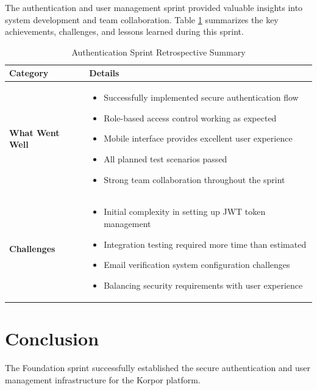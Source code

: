 The authentication and user management sprint provided valuable insights into system development and team collaboration. Table \ref{tab:auth-retrospective} summarizes the key achievements, challenges, and lessons learned during this sprint.
\newpage
\begin{table}[htbp]
    \centering
    \begin{tabular}{|p{3cm}|p{10cm}|}
        \hline
        \textbf{Category} & \textbf{Details} \\
        \hline
        \textbf{What Went Well} & 
        \begin{itemize}
            \item Successfully implemented secure authentication flow
            \item Role-based access control working as expected
            \item Mobile interface provides excellent user experience
            \item All planned test scenarios passed
            \item Strong team collaboration throughout the sprint
        \end{itemize} \\
        \hline
        \textbf{Challenges} & 
        \begin{itemize}
            \item Initial complexity in setting up JWT token management
            \item Integration testing required more time than estimated
            \item Email verification system configuration challenges
            \item Balancing security requirements with user experience
        \end{itemize} \\
        \hline
    \end{tabular}
    \caption{Authentication Sprint Retrospective Summary}
    \label{tab:auth-retrospective}
\end{table}

\section*{Conclusion}

The Foundation sprint successfully established the secure authentication and user management infrastructure for the Korpor platform.

